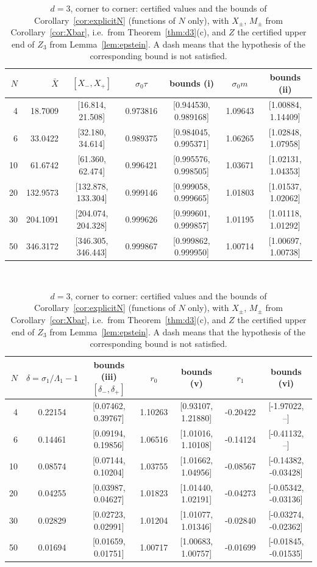 \documentclass[11pt,a4paper]{article}
\newcommand{\Xb}{\bar X}
\theoremstyle{plain}
\theoremstyle{definition}
\numberwithin{equation}{section}
\begin{document}
\begin{table}[ht]\centering\footnotesize
\begin{tabular}{rrccccc}\toprule
$N$ & $\Xb$ & $[X_-,X_+]$ & $\sigma_0\tau$ & bounds (i) & $\sigma_0m$ & bounds (ii)\\\midrule
4 & 18.7009 & [16.814, 21.508] & 0.973816 & [0.944530, 0.989168] & 1.09643 & [1.00884, 1.14409]\\
6 & 33.0422 & [32.180, 34.614] & 0.989375 & [0.984045, 0.995371] & 1.06265 & [1.02848, 1.07958]\\
10 & 61.6742 & [61.360, 62.474] & 0.996421 & [0.995576, 0.998505] & 1.03671 & [1.02131, 1.04353]\\
20 & 132.9573 & [132.878, 133.304] & 0.999146 & [0.999058, 0.999665] & 1.01803 & [1.01537, 1.02062]\\
30 & 204.1091 & [204.074, 204.328] & 0.999626 & [0.999601, 0.999857] & 1.01195 & [1.01118, 1.01292]\\
50 & 346.3172 & [346.305, 346.443] & 0.999867 & [0.999862, 0.999950] & 1.00714 & [1.00697, 1.00738]\\
\bottomrule\end{tabular}
\\[6pt]\begin{tabular}{rcccccc}\toprule
$N$ & $\delta=\sigma_1/\Lambda_1-1$ & bounds (iii) $[\delta_-,\delta_+]$ & $r_0$ & bounds (v) & $r_1$ & bounds (vi)\\\midrule
4 & 0.22154 & [0.07462, 0.39767] & 1.10263 & [0.93107, 1.21880] & -0.20422 & [-1.97022, --]\\
6 & 0.14461 & [0.09194, 0.19856] & 1.06516 & [1.01016, 1.10108] & -0.14124 & [-0.41132, --]\\
10 & 0.08574 & [0.07144, 0.10204] & 1.03755 & [1.01662, 1.04956] & -0.08567 & [-0.14382, -0.03428]\\
20 & 0.04255 & [0.03987, 0.04627] & 1.01823 & [1.01440, 1.02191] & -0.04273 & [-0.05342, -0.03136]\\
30 & 0.02829 & [0.02723, 0.02991] & 1.01204 & [1.01077, 1.01346] & -0.02840 & [-0.03274, -0.02362]\\
50 & 0.01694 & [0.01659, 0.01751] & 1.00717 & [1.00683, 1.00757] & -0.01699 & [-0.01845, -0.01535]\\
\bottomrule\end{tabular}
\caption{$d=3$, corner to corner: certified values and the bounds of Corollary~\ref{cor:explicitN} (functions of $N$ only), with $X_\pm$, $M_\pm$ from Corollary~\ref{cor:Xbar}, i.e.\ from Theorem~\ref{thm:d3}(c), and $Z$ the certified upper end of $Z_3$ from Lemma~\ref{lem:epstein}. A dash means that the hypothesis of the corresponding bound is not satisfied.}\label{tab:cc3}\end{table}
\end{document}
